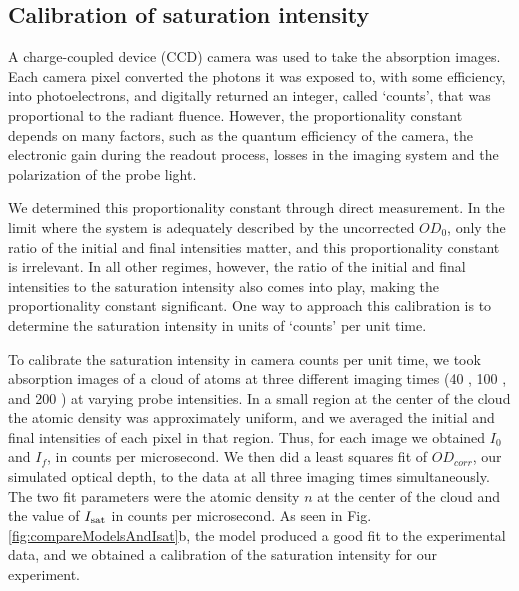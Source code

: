 \documentclass[12pt]{iopart}
\begin{document}
\subsection{Calibration of saturation intensity}
A charge-coupled device (CCD) camera was used to take the absorption images.  Each camera pixel  converted the photons it was exposed to, with some efficiency, into photoelectrons, and digitally returned an integer, called `counts', that was proportional to the radiant fluence.  However, the proportionality constant depends on many factors, such as the quantum efficiency of the camera, the electronic gain during the readout process, losses in the imaging system and the polarization of the probe light. 
\par We determined this proportionality constant through direct measurement. In the limit where the system is adequately described by the uncorrected $OD_0$, only the ratio of the initial and final intensities matter, and this proportionality constant is irrelevant. In all other regimes, however, the ratio of the initial and final intensities to the saturation intensity also comes into play, making the proportionality constant significant. One way to approach this calibration is to determine the saturation intensity in units of `counts' per unit time. 
\par To calibrate the saturation intensity in camera counts per unit time, we took absorption images of a cloud of \K{} atoms at three different imaging times (40 \us{}, 100 \us{}, and 200 \us{}) at varying probe intensities. In a small region at the center of the cloud the atomic density was approximately uniform, and we averaged the initial and final intensities of each pixel in that region. Thus, for each image we obtained $I_0$ and $I_f$, in counts per microsecond. We then did a least squares fit of $OD_{corr}$, our simulated optical depth, to the data at all three imaging times simultaneously. The two fit parameters were the atomic density $n$ at the center of the cloud and the value of $I_{\rm{sat}}$ in counts per microsecond. As seen in Fig. \ref{fig:compareModelsAndIsat}b, the model produced a good fit to the experimental data, and we obtained a calibration of the saturation intensity for our experiment. 
\end{document}
